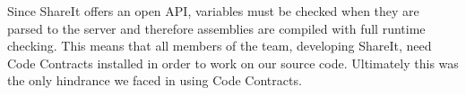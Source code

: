 \documentclass[../report.tex]{subfiles}
\begin{document}
Since ShareIt offers an open API, variables must be checked when they are parsed to the server and therefore assemblies are compiled with full runtime checking. This means that all members of the team, developing ShareIt, need Code Contracts installed in order to work on our source code. Ultimately this was the only hindrance we faced in using Code Contracts.






\end{document}

